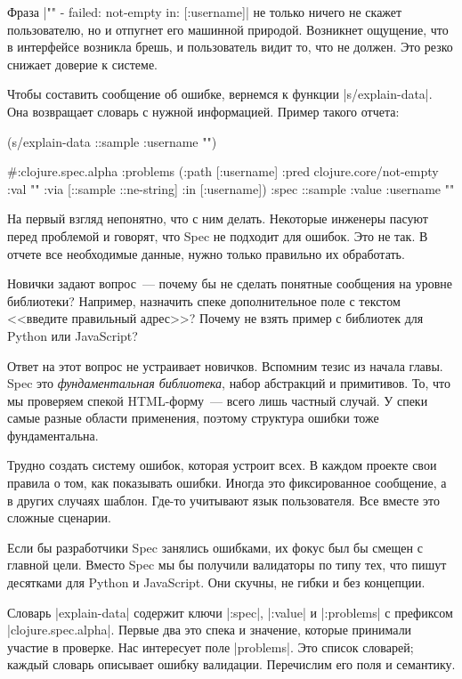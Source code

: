 Фраза \spverb|"" - failed: not-empty in: [:username]| не только ничего не скажет
пользователю, но и отпугнет его машинной природой. Возникнет ощущение, что в
интерфейсе возникла брешь, и пользователь видит то, что не должен. Это резко
снижает доверие к системе.

Чтобы составить сообщение об ошибке, вернемся к функции \spverb|s/explain-data|.
Она возвращает словарь с нужной информацией. Пример такого отчета:

\begin{english}
  \begin{clojure}
(s/explain-data ::sample {:username ""})

#:clojure.spec.alpha
{:problems
 ({:path [:username]
   :pred clojure.core/not-empty
   :val ""
   :via [::sample ::ne-string]
   :in [:username]})
 :spec ::sample
 :value {:username ""}}
  \end{clojure}
\end{english}

На первый взгляд непонятно, что с ним делать. Некоторые инженеры пасуют перед
проблемой и говорят, что Spec не подходит для ошибок. Это не так. В отчете все
необходимые данные, нужно только правильно их обработать.

Новички задают вопрос~--- почему бы не сделать понятные сообщения на уровне
библиотеки? Например, назначить спеке дополнительное поле с текстом <<введите
правильный адрес>>? Почему не взять пример с библиотек для Python или
JavaScript?

Ответ на этот вопрос не устраивает новичков. Вспомним тезис из начала
главы. Spec это \emph{фундаментальная библиотека}, набор абстракций и
примитивов. То, что мы проверяем спекой HTML-форму~--- всего лишь частный
случай. У спеки самые разные области применения, поэтому структура ошибки тоже
фундаментальна.

Трудно создать систему ошибок, которая устроит всех. В каждом проекте свои
правила о том, как показывать ошибки. Иногда это фиксированное сообщение, а в
других случаях шаблон. Где-то учитывают язык пользователя. Все вместе это
сложные сценарии.

Если бы разработчики Spec занялись ошибками, их фокус был бы смещен с главной
цели. Вместо Spec мы бы получили валидаторы по типу тех, что пишут десятками для
Python и JavaScript. Они скучны, не гибки и без концепции.

Словарь \spverb|explain-data| содержит ключи \spverb|:spec|, \spverb|:value| и
\spverb|:problems| с префиксом \spverb|clojure.spec.alpha|. Первые два это спека
и значение, которые принимали участие в проверке. Нас интересует поле
\spverb|problems|. Это список словарей; каждый словарь описывает ошибку
валидации. Перечислим его поля и семантику.

